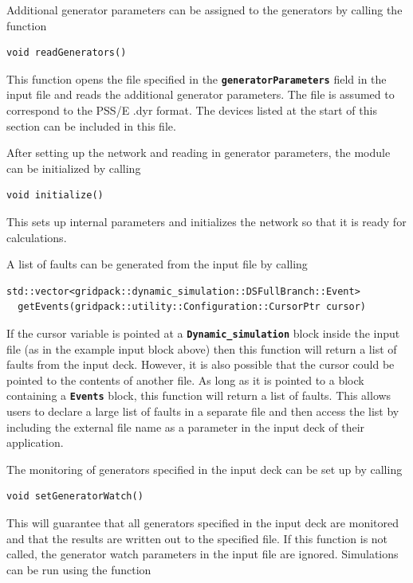 Additional generator parameters can be assigned to the generators by calling the function

{
\color{red}
\begin{Verbatim}[fontseries=b]
void readGenerators()
\end{Verbatim}
}

This function opens the file specified in the \texttt{\textbf{generatorParameters}} field in the input file and reads the additional generator parameters. The file is assumed to correspond to the PSS/E .dyr format. The devices listed at the start of this section can be included in this file.

After setting up the network and reading in generator parameters, the module can be initialized by calling

{
\color{red}
\begin{Verbatim}[fontseries=b]
void initialize()
\end{Verbatim}
}

This sets up internal parameters and initializes the network so that it is ready for calculations.

A list of faults can be generated from the input file by calling

{
\color{red}
\begin{Verbatim}[fontseries=b]
std::vector<gridpack::dynamic_simulation::DSFullBranch::Event>
  getEvents(gridpack::utility::Configuration::CursorPtr cursor)
\end{Verbatim}
}

If the cursor variable is pointed at a \texttt{\textbf{Dynamic\_simulation}} block inside the input file (as in the example input block above) then this function will return a list of faults from the input deck. However, it is also possible that the cursor could be pointed to the contents of another file. As long as it is pointed to a block containing a \texttt{\textbf{Events}} block, this function will return a list of faults. This allows users to declare a large list of faults in a separate file and then access the list by including the external file name as a parameter in the input deck of their application.

The monitoring of generators specified in the input deck can be set up by calling

{
\color{red}
\begin{Verbatim}[fontseries=b]
void setGeneratorWatch()
\end{Verbatim}
}

This will guarantee that all generators specified in the input deck are monitored and that the results are written out to the specified file. If this function is not called, the generator watch parameters in the input file are ignored.
Simulations can be run using the function

